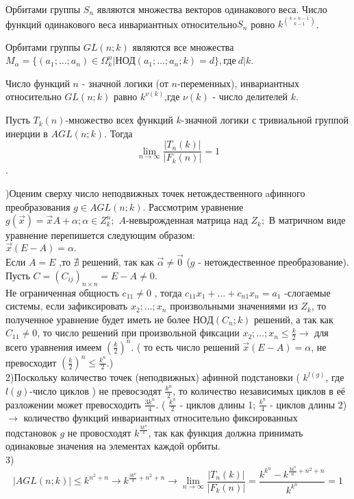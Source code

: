 Орбитами группы $S_n$ являются множества векторов одинакового веса. Число функций одинакового веса инвариантных относительно$ S_n$ ровно $k^{k+n-1 \choose k-1}$.

\thr Орбитами группы $GL(n;k)$ являются все множества $M_\alpha=\{(a_1;\dots;a_n)\in \Omega_k^n|\mathrm{\text{НОД}}(a_1;\dots;a_n;k)=d\}, \text{где}\   d|k$.
                   
\conseq Число функций $n$ - значной логики (от $n$-переменных), инвариантных относительно $GL(n;k)$ равно $k^{\nu(k)}$,где $\nu(k)$ - число делителей $k$.

\thr
Пусть $T_k(n)$-множество всех функций $k$-значной логики с тривиальной группой инерции в $AGL(n;k)$. Тогда $$\lim_{n\to\infty} \frac{|T_n(k)|}{|F_k(n)|}=1$$.

)Оценим сверху число неподвижных точек нетождественного aфинного преобразования $g \in AGL(n;k)$.  Рассмотрим уравнение $g(\vec{x})=\vec{x}A+\alpha;\alpha \in Z_k^n;$ $A$-невырожденная матрица над $Z_k;$ В матричном виде уравнение перепишется следующим образом:\\
$\vec{x}(E-A)=\alpha. $\\
Если $A=E$ ,то $\nexists$ решений, так как $\vec{\alpha}\neq \vec{0}$ ($g$ - нетождественное преобразование). Пусть $ C=(C_{ij})_{n \times n} = E-A \neq 0 $.\\

Не ограниченная общность $c_{11} \neq 0 $ , тогда $ c_{11} x_1 + \ldots + c_{n1} x_n = a_1 $ -слогаемые системы, если зафиксировать $x_2;\dots;x_n $ произвольными значениями из $Z_k $, то полученное уравнение будет иметь не более $НОД(C_n;k) $ решений, а так как $C_{11} \neq 0$, то число решений при произвольной фиксации $x_2;\dots;x_n \leqslant \frac{k}{2} \rightarrow $ для всего уравнения имеем $ (\frac {k}{2})^n$. ( то есть число решений $\vec{x}(E-A) = \alpha $, не превосходит $(\frac {k}{2})^n \leqslant \frac {k^n}{2} $.)\\
2)Поскольку количество точек (неподвижных) афинной подстановки ( $ k^{l(g)} $, где $l(g)$-число циклов ) не превосзодят $\frac {k^n}{2} $, то количество независимых циклов в её разложении может превосходить $\frac {3k^n}{4} $. ( $\frac {k^n}{2} $ - циклов длины 1; $\frac {k^n}{4} $ - циклов длины 2)\\
$\rightarrow $ количество функций инвариантных относительно фиксированных подстановок $g$ не провосходят $k^{\frac{3k^n}{4}}$, так как функция должна принимать одинаковые значения на элементах каждой орбиты. \\
3) $$|AGL(n;k)| \leqslant k^{n^2+n} \rightarrow k^{\frac{3k^n}{4} +n^2 +n} \rightarrow \lim_{n\to\infty} \frac{|T_n(k)|}{|F_k(n)|} = \frac {k^{k^n}-k^{\frac {3k^n}{n}+n^2+n}}{k^{k^n}}=1$$\\

